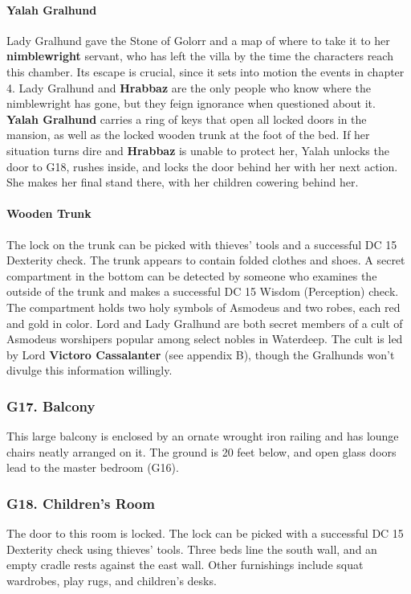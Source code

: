 \documentclass[10pt,a4paper,twoside,twocolumn,openany,nodeprecatedcode]{dndbook}
\begin{document}
\paragraph{Yalah Gralhund}
Lady Gralhund gave the Stone of Golorr and a map of where to take it to her \textbf{nimblewright} servant, who has left the villa by the time the characters reach this chamber. Its escape is crucial, since it sets into motion the events in chapter 4.
Lady Gralhund and \textbf{Hrabbaz} are the only people who know where the nimblewright has gone, but they feign ignorance when questioned about it.
\textbf{Yalah Gralhund} carries a ring of keys that open all locked doors in the mansion, as well as the locked wooden trunk at the foot of the bed. If her situation turns dire and \textbf{Hrabbaz} is unable to protect her, Yalah unlocks the door to G18, rushes inside, and locks the door behind her with her next action. She makes her final stand there, with her children cowering behind her.
\paragraph{Wooden Trunk}
The lock on the trunk can be picked with thieves' tools and a successful DC 15 Dexterity check. The trunk appears to contain folded clothes and shoes. A secret compartment in the bottom can be detected by someone who examines the outside of the trunk and makes a successful DC 15 Wisdom (Perception) check. The compartment holds two holy symbols of Asmodeus and two robes, each red and gold in color.
Lord and Lady Gralhund are both secret members of a cult of Asmodeus worshipers popular among select nobles in Waterdeep. The cult is led by Lord \textbf{Victoro Cassalanter} (see appendix B), though the Gralhunds won't divulge this information willingly.
\subsubsection{G17. Balcony}
This large balcony is enclosed by an ornate wrought iron railing and has lounge chairs neatly arranged on it. The ground is 20 feet below, and open glass doors lead to the master bedroom (G16).
\subsubsection{G18. Children's Room}
The door to this room is locked. The lock can be picked with a successful DC 15 Dexterity check using thieves' tools.
Three beds line the south wall, and an empty cradle rests against the east wall. Other furnishings include squat wardrobes, play rugs, and children's desks.
\end{document}
